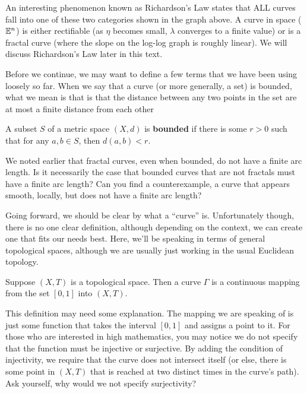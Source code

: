 An interesting phenomenon known as Richardson's Law states that ALL curves fall into one of these two categories shown in the graph above. A curve in space ($\mathbb{E}^n$) is either rectifiable (as $\eta$ becomes small, $\lambda$ converges to a finite value) or is a fractal curve (where the slope on the log-log graph is roughly linear). We will discuss Richardson's Law later in this text.

Before we continue, we may want to define a few terms that we have been using loosely so far. When we say that a curve (or more generally, a set) is bounded, what we mean is that is that the distance between any two points in the set are at most a finite distance from each other 

\begin{definition}
A subset $S$ of a metric space $(X,d)$ is \textbf{bounded} if there is some $r>0$ such that for any $a,b\in S$, then $d(a,b)<r$.
\end{definition}

\begin{exercise}
    
    We noted earlier that fractal curves, even when bounded, do not have a finite arc length. Is it necessarily the case that bounded curves that are not fractals must have a finite arc length? Can you find a counterexample, a curve that appears smooth, locally, but does not have a finite arc length? 
\end{exercise}

Going forward, we should be clear by what a ``curve'' is. Unfortunately though, there is no one clear definition, although depending on the context, we can create one that fits our needs best. Here, we'll be speaking in terms of general topological spaces, although we are usually just working in the usual Euclidean topology. 

\begin{definition}[Curve]
    Suppose $(X,T)$ is a topological space. Then a curve $\Gamma$ is a continuous mapping from the set $[0,1]$ into $(X,T)$.
\end{definition}

This definition may need some explanation. The mapping we are speaking of is just some function that takes the interval $[0,1]$ and assigns a point to it. For those who are interested in high mathematics, you may notice we do not specify that the function must be injective or surjective. By adding the condition of injectivity, we require that the curve does not intersect itself (or else, there is some point in $(X,T)$ that is reached at two distinct times in the curve's path). Ask yourself, why would we not specify surjectivity?\\

